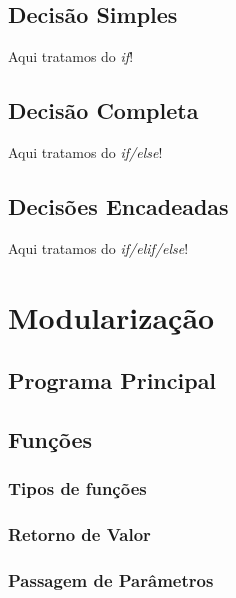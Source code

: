 \documentclass[
]{book}
\begin{document}
\hypertarget{decis-if}{%
\section{Decisão Simples}\label{decis-if}}

Aqui tratamos do \emph{if}!

\hypertarget{decis-if-else}{%
\section{Decisão Completa}\label{decis-if-else}}

Aqui tratamos do \emph{if/else}!

\hypertarget{decis-if-elif-else}{%
\section{Decisões Encadeadas}\label{decis-if-elif-else}}

Aqui tratamos do \emph{if/elif/else}!

\hypertarget{modul}{%
\chapter{Modularização}\label{modul}}

\hypertarget{modul-main}{%
\section{Programa Principal}\label{modul-main}}

\hypertarget{modul-funcao}{%
\section{Funções}\label{modul-funcao}}

\hypertarget{modul-funcao-tipos}{%
\subsection{Tipos de funções}\label{modul-funcao-tipos}}

\hypertarget{modul-funcao-return}{%
\subsection{Retorno de Valor}\label{modul-funcao-return}}

\hypertarget{modul-funcao-param}{%
\subsection{Passagem de Parâmetros}\label{modul-funcao-param}}
\end{document}

